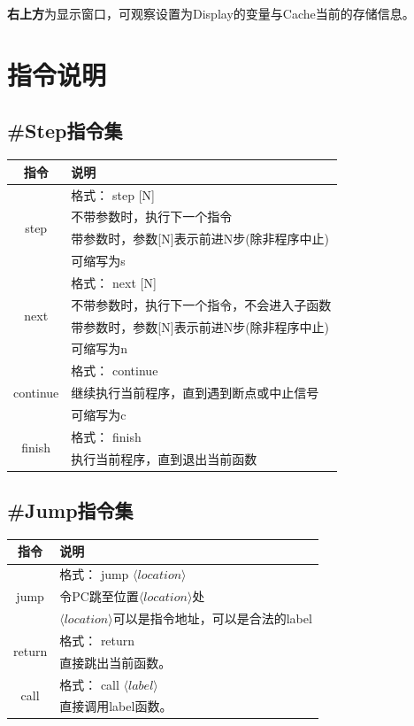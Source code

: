 \documentclass[12pt]{article} %
\begin{document}
\begin{sloppypar}
{\bf 右上方}为显示窗口，可观察设置为Display的变量与Cache当前的存储信息。

\clearpage
\section{指令说明}

\subsection{\#Step指令集}

\begin{table}[h]
\begin{tabular}{|c|l|}
\hline
{\bf 指令} & {\bf 说明} \\ 
\hline
\multirow{4}{*}{step} & 格式： step [N] \\
 & 不带参数时，执行下一个指令 \\
 & 带参数时，参数[N]表示前进N步(除非程序中止) \\
 & 可缩写为s \\ 
\hline
\multirow{4}{*}{next} & 格式： next [N] \\
 & 不带参数时，执行下一个指令，不会进入子函数 \\
 & 带参数时，参数[N]表示前进N步(除非程序中止) \\
 & 可缩写为n \\ 
\hline
\multirow{3}{*}{continue} & 格式： continue \\
 & 继续执行当前程序，直到遇到断点或中止信号 \\
 & 可缩写为c \\
\hline
\multirow{2}{*}{finish} & 格式： finish \\
 & 执行当前程序，直到退出当前函数 \\
\hline
\end{tabular}
\end{table}

\subsection{\#Jump指令集}

\begin{table}[h]
\begin{tabular}{|c|l|}
\hline
{\bf 指令} & {\bf 说明} \\ 
\hline
\multirow{3}{*}{jump} & 格式： jump $\langle location\rangle$ \\
 & 令PC跳至位置$\langle location\rangle$处 \\
 & $\langle location\rangle$可以是指令地址，可以是合法的label \\
\hline
\multirow{2}{*}{return} & 格式： return \\
 & 直接跳出当前函数。 \\
\hline
\multirow{2}{*}{call} & 格式： call $\langle label\rangle$ \\
 &  直接调用label函数。 \\
\hline
\end{tabular}
\end{table}


\end{sloppypar}
\end{document}
